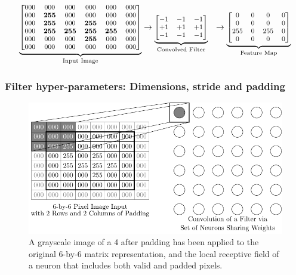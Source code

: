 \documentclass[xcolor={table}]{beamer}
\begin{document}
 \begin{frame} 
\begin{alignat}{2}
\underbrace{
\footnotesize
\begin{bmatrix}
000 & 000 & 000 & 000 & 000 & 000\\
000 & \mathbf{255} & 000 & 000 & 000 & 000\\
000 & \mathbf{255} & 000 & \mathbf{255} & 000 & 000\\
000 & \mathbf{255} & \mathbf{255} & \mathbf{255} & \mathbf{255} & 000\\
000 & 000 & 000 & \mathbf{255} & 000 & 000\\
000 & 000 & 000 & 000 & 000 & 000\\
\end{bmatrix}
}_{\text{Input Image}}
&\rightarrow
\underbrace{
\footnotesize
\begin{bmatrix}
-1 & -1 & -1\\
+1 & +1 & +1\\
-1 & -1 & -1\\
\end{bmatrix}
}_{\text{Convolved Filter}}
&\rightarrow
\underbrace{
\footnotesize
\begin{bmatrix}
0 & 0 & 0 & 0\\
0 & 0 & 0 & 0\\
255 & 0 & 255 & 0\\
0 & 0 & 0 & 0\\
\end{bmatrix}
}_{\text{Feature Map}}
\label{eq:featuremap2}
\end{alignat}
\end{frame} 

\subsubsection{Filter hyper-parameters: Dimensions, stride and padding}


 \begin{frame} 
\begin{figure}[t]
\centerline{
\includegraphics[width=\textwidth]{./images/fmlpda_8_34.pdf}
}
\caption{A grayscale image of a 4 after padding has been applied to the original 6-by-6 matrix representation, and the local receptive field of a neuron that includes both valid and padded pixels.}
\label{fig:cnn-padding}
\end{figure}
\end{frame} 
\end{document}
